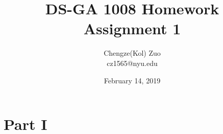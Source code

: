 \documentclass[12pt]{article}
\begin{document}
\author{Chengze(Kol) Zuo\\cz1565@nyu.edu}
\title{DS-GA 1008 Homework Assignment 1}
\date{February 14, 2019}
\maketitle


\section*{\centering Part I}
\subsection*{}
\end{document}
